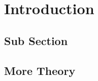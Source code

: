 \section{Introduction} \label{sec:introduction}

\blindtext[2]

\subsection{Sub Section}

\blindtext[2]



\blindtext[1]

\subsection{More Theory}

\blindtext[1]
\cite{lamport1994latex}
\blindtext[1]